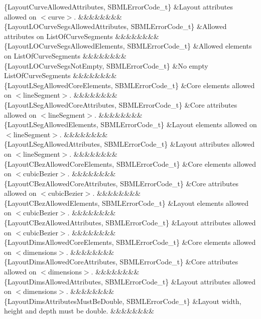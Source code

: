 \begin{DoxyParagraph}{}
\begin{longtabu}
\{Layout\+Curve\+Allowed\+Attributes, S\+B\+M\+L\+Error\+Code\+\_\+t\} &Layout attributes allowed on {\ttfamily $<$curve$>$}. &&&&&&&&\\
\{Layout\+L\+O\+Curve\+Segs\+Allowed\+Attributes, S\+B\+M\+L\+Error\+Code\+\_\+t\} &Allowed attributes on List\+Of\+Curve\+Segments &&&&&&&&\\
\{Layout\+L\+O\+Curve\+Segs\+Allowed\+Elements, S\+B\+M\+L\+Error\+Code\+\_\+t\} &Allowed elements on List\+Of\+Curve\+Segments &&&&&&&&\\
\{Layout\+L\+O\+Curve\+Segs\+Not\+Empty, S\+B\+M\+L\+Error\+Code\+\_\+t\} &No empty List\+Of\+Curve\+Segments &&&&&&&&\\
\{Layout\+L\+Seg\+Allowed\+Core\+Elements, S\+B\+M\+L\+Error\+Code\+\_\+t\} &Core elements allowed on {\ttfamily $<$line\+Segment$>$}. &&&&&&&&\\
\{Layout\+L\+Seg\+Allowed\+Core\+Attributes, S\+B\+M\+L\+Error\+Code\+\_\+t\} &Core attributes allowed on {\ttfamily $<$line\+Segment$>$}. &&&&&&&&\\
\{Layout\+L\+Seg\+Allowed\+Elements, S\+B\+M\+L\+Error\+Code\+\_\+t\} &Layout elements allowed on {\ttfamily $<$line\+Segment$>$}. &&&&&&&&\\
\{Layout\+L\+Seg\+Allowed\+Attributes, S\+B\+M\+L\+Error\+Code\+\_\+t\} &Layout attributes allowed on {\ttfamily $<$line\+Segment$>$}. &&&&&&&&\\
\{Layout\+C\+Bez\+Allowed\+Core\+Elements, S\+B\+M\+L\+Error\+Code\+\_\+t\} &Core elements allowed on {\ttfamily $<$cubic\+Bezier$>$}. &&&&&&&&\\
\{Layout\+C\+Bez\+Allowed\+Core\+Attributes, S\+B\+M\+L\+Error\+Code\+\_\+t\} &Core attributes allowed on {\ttfamily $<$cubic\+Bezier$>$}. &&&&&&&&\\
\{Layout\+C\+Bez\+Allowed\+Elements, S\+B\+M\+L\+Error\+Code\+\_\+t\} &Layout elements allowed on {\ttfamily $<$cubic\+Bezier$>$}. &&&&&&&&\\
\{Layout\+C\+Bez\+Allowed\+Attributes, S\+B\+M\+L\+Error\+Code\+\_\+t\} &Layout attributes allowed on {\ttfamily $<$cubic\+Bezier$>$}. &&&&&&&&\\
\{Layout\+Dims\+Allowed\+Core\+Elements, S\+B\+M\+L\+Error\+Code\+\_\+t\} &Core elements allowed on {\ttfamily $<$dimensions$>$}. &&&&&&&&\\
\{Layout\+Dims\+Allowed\+Core\+Attributes, S\+B\+M\+L\+Error\+Code\+\_\+t\} &Core attributes allowed on {\ttfamily $<$dimensions$>$}. &&&&&&&&\\
\{Layout\+Dims\+Allowed\+Attributes, S\+B\+M\+L\+Error\+Code\+\_\+t\} &Layout attributes allowed on {\ttfamily $<$dimensions$>$}. &&&&&&&&\\
\{Layout\+Dims\+Attributes\+Must\+Be\+Double, S\+B\+M\+L\+Error\+Code\+\_\+t\} &Layout \textquotesingle{}width\textquotesingle{}, \textquotesingle{}height\textquotesingle{} and \textquotesingle{}depth\textquotesingle{} must be double. &&&&&&&&\\
\end{longtabu}


\end{DoxyParagraph}
